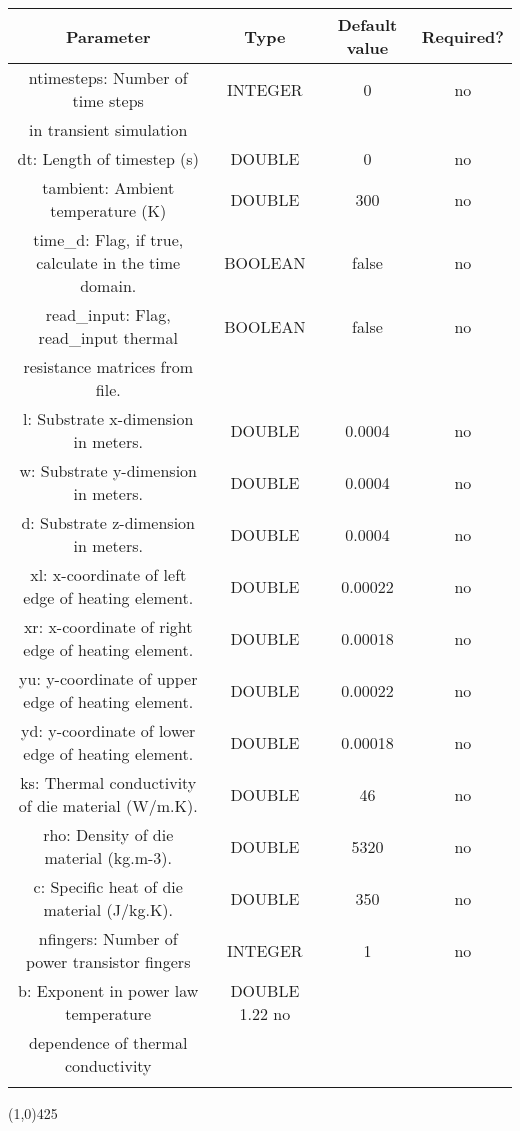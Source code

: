 \documentclass{article}
\begin{document}
\begin{table}[H]
\begin{tabular}{|c|c|c|c|}
\hline
Parameter&Type&Default value&Required?\\
\hline
ntimesteps: Number of time steps & INTEGER & 0 & no \\
in transient simulation & & & \\
\hline
dt: Length of timestep (s) & DOUBLE & 0 & no \\
\hline
tambient: Ambient temperature (K) & DOUBLE & 300 & no\\
\hline
time\_d: Flag, if true, calculate in the time domain. &
BOOLEAN & false & no \\
\hline
read\_input: Flag, read\_input thermal & BOOLEAN & false & no \\
resistance matrices from file. & & & \\
\hline
l: Substrate x-dimension in meters. & DOUBLE & 0.0004 & no \\
\hline
w: Substrate y-dimension in meters. & DOUBLE & 0.0004 & no \\
\hline
d: Substrate z-dimension in meters. & DOUBLE & 0.0004 & no \\
\hline
xl: x-coordinate of left edge of heating element. & DOUBLE
& 0.00022 & no \\
\hline
xr: x-coordinate of right edge of heating element. & DOUBLE
& 0.00018 & no \\
\hline
yu: y-coordinate of upper edge of heating element. & DOUBLE
& 0.00022 & no \\
\hline
yd: y-coordinate of lower edge of heating element. & DOUBLE
& 0.00018 & no \\
\hline
ks: Thermal conductivity of die material (W/m.K). & DOUBLE
& 46 & no \\
\hline
rho: Density of die material (kg.m-3). & DOUBLE & 5320 & no \\
\hline
c: Specific heat of die material (J/kg.K). & DOUBLE & 350 & no \\
\hline
nfingers: Number of power transistor fingers & INTEGER & 1
& no \\
\hline
b: Exponent in power law temperature & DOUBLE 1.22 no \\
dependence of thermal conductivity & & & \\
\par
\hline
\end{tabular}
\end{table}
\noindent\linethickness{0.5mm}\line(1,0){425}
\newline
\end{document}
